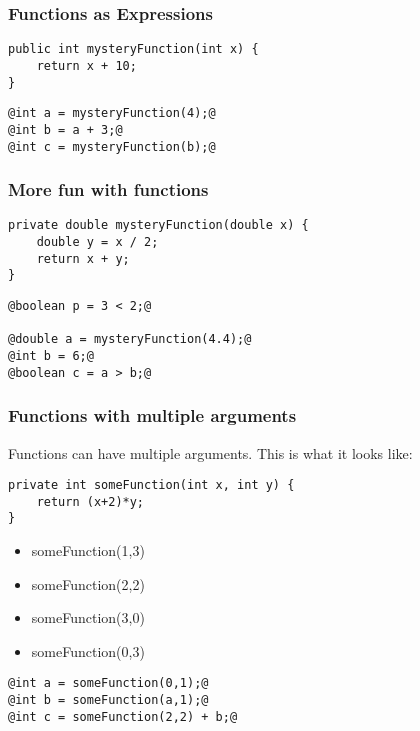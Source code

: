 \documentclass{beamer}
\begin{document}
\begin{frame}[fragile]
\frametitle{Functions as Expressions}
\begin{lstlisting}
public int mysteryFunction(int x) {
    return x + 10;
}
\end{lstlisting}
\begin{lstlisting}[style=base]
@int a = mysteryFunction(4);@
@int b = a + 3;@
@int c = mysteryFunction(b);@
\end{lstlisting}

\end{frame}

\begin{frame}[fragile]
\frametitle{More fun with functions}
\begin{lstlisting}
private double mysteryFunction(double x) {
    double y = x / 2;
    return x + y;
}
\end{lstlisting}
\begin{lstlisting}[style=base]
@boolean p = 3 < 2;@

@double a = mysteryFunction(4.4);@
@int b = 6;@
@boolean c = a > b;@
\end{lstlisting}
\end{frame}

\begin{frame}[fragile]
\frametitle{Functions with multiple arguments}
Functions can have multiple arguments. This is what it looks like:
\pause
\begin{lstlisting}
private int someFunction(int x, int y) {
    return (x+2)*y;
}
\end{lstlisting}
\begin{itemize}
\pause
\item someFunction(1,3)
\pause
\item someFunction(2,2)
\pause
\item someFunction(3,0)
\pause
\item someFunction(0,3)
\end{itemize}
\pause
\begin{lstlisting}[style=base]
@int a = someFunction(0,1);@
@int b = someFunction(a,1);@
@int c = someFunction(2,2) + b;@
\end{lstlisting}
\end{frame}
\end{document}
